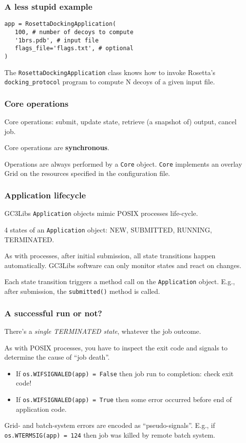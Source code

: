 \documentclass[presentation]{beamer}
\begin{document}
\begin{frame}[fragile]
\frametitle{A less stupid example}
\label{sec-9}

\begin{verbatim}
app = RosettaDockingApplication(
   100, # number of decoys to compute
   '1brs.pdb', # input file
   flags_file='flags.txt', # optional
)
\end{verbatim}

  The \texttt{RosettaDockingApplication} class knows how to invoke Rosetta's
  \texttt{docking\_protocol} program to compute N decoys of a given input file.
\end{frame}
\begin{frame}
\frametitle{Core operations}
\label{sec-10}

  Core operations: submit, update state, retrieve (a
  snapshot of) output, cancel job.

  Core operations are \textbf{synchronous}.
  
  Operations are always performed by a \texttt{Core} object.
  \texttt{Core} implements an overlay Grid on the resources 
  specified in the configuration file.
\end{frame}
\begin{frame}
\frametitle{Application lifecycle}
\label{sec-11}

  GC3Libs \texttt{Application} objects mimic POSIX processes life-cycle.

  4 states of an \texttt{Application} object: NEW, SUBMITTED, RUNNING, TERMINATED.

  As with processes, after initial submission, all state transitions
  happen automatically.  GC3Libs software can only monitor states and
  react on changes.

  Each state transition triggers a method call on the \texttt{Application}
  object.  E.g., after submission, the \texttt{submitted()} method is called.
\end{frame}
\begin{frame}
\frametitle{A successful run or not?}
\label{sec-12}

  There's a \emph{single TERMINATED state}, whatever the job outcome.
  
  As with POSIX processes, you have to inspect the exit code and
  signals to determine the cause of ``job death''.
\begin{itemize}
\item If \texttt{os.WIFSIGNALED(app) = False} then job run to completion:
    check exit code!
\item If \texttt{os.WIFSIGNALED(app) = True} then some error occurred before
    end of application code.
\end{itemize}
  
  Grid- and batch-system errors are encoded as ``pseudo-signals''.
  E.g., if \texttt{os.WTERMSIG(app) = 124} then job was killed by remote
  batch system.
  
\end{frame}
\end{document}
